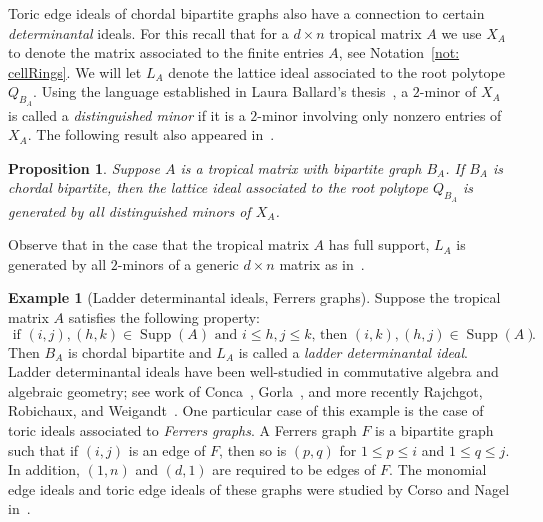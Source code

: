 \documentclass[11pt]{article}
\newtheorem{prop}[theo]{Proposition}
\theoremstyle{definition}
\newtheorem{example}[theo]{Example}
\numberwithin{equation}{section}
\newcommand{\Supp}{\operatorname{Supp}}
\begin{document}
Toric edge ideals of chordal bipartite graphs also have a connection to certain \emph{determinantal} ideals.  For this recall that for a $d \times n$ tropical matrix $A$ we use $X_A$ to denote the matrix associated to the finite entries $A$, see Notation~\ref{not: cellRings}.  We will let $L_A$ denote the lattice ideal associated to the root polytope $Q_{B_A}$.
Using the language established in Laura Ballard's thesis~\cite{ballard2021properties}, a $2$-minor of $X_A$ is called a \emph{distinguished minor} if it is a $2$-minor involving only nonzero entries of $X_A$. 
The following result also appeared in~\cite{ballard2021properties}.

\begin{prop}\label{prop: ladder-like} Suppose $A$ is a tropical matrix with bipartite graph $B_A$. If $B_A$ is chordal bipartite, then the lattice ideal associated to the root polytope $Q_{B_A}$ is generated by all distinguished minors of $X_A$.
\end{prop}

Observe that in the case that the tropical matrix $A$ has full support, $L_A$ is generated by all $2$-minors of a generic $d\times n$ matrix as in~\cite{block2006tropical}.

\begin{example}[Ladder determinantal ideals, Ferrers graphs]\label{ex: ladder} Suppose the tropical matrix $A$ satisfies the following property:
$$
\text{ if $(i,j),(h,k)\in \Supp(A)$ and $i\leq h, j\leq k$, then $(i,k),(h,j)\in\Supp(A)$}.
$$
Then $B_A$ is chordal bipartite and $L_A$ is called a \emph{ladder determinantal ideal}.
Ladder determinantal ideals have been well-studied in commutative algebra and algebraic geometry; see work of Conca~\cite{conca1995, conca1996gorenstein}, Gorla~\cite{gorla2007mixed}, and more recently Rajchgot, Robichaux, and Weigandt~\cite{rajchgot2022castelnuovo}.
One particular case of this example is the case of toric ideals associated to \textit{Ferrers graphs}. A Ferrers graph $F$ is a bipartite graph such that if $(i,j)$ is an edge of $F$, then so is $(p,q)$ for $1\leq p\leq i$ and $1\leq q \leq j$. In addition, $(1, n)$ and $(d, 1)$ are required to be edges of $F$. The monomial edge ideals and toric edge ideals of these graphs were studied by Corso and Nagel in~\cite{corso2008specializations, corso2009}.
\end{example}
\end{document}
